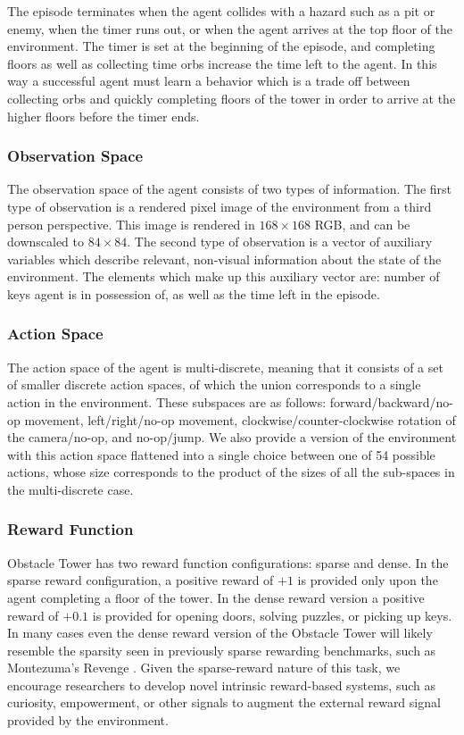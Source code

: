 \documentclass{article}
\begin{document}
The episode terminates when the agent collides with a hazard such as a pit or enemy, when the timer runs out, or when the agent arrives at the top floor of the environment. The timer is set at the beginning of the episode, and completing floors as well as collecting time orbs increase the time left to the agent. In this way a successful agent must learn a behavior which is a trade off between collecting orbs and quickly completing floors of the tower in order to arrive at the higher floors before the timer ends.

\subsubsection{Observation Space} The observation space of the agent consists of two types of information. The first type of observation is a rendered pixel image of the environment from a third person perspective. This image is rendered in $168\times168$ RGB, and can be downscaled to $84\times84$. The second type of observation is a vector of auxiliary variables which describe relevant, non-visual information about the state of the environment. The elements which make up this auxiliary vector are: number of keys agent is in possession of, as well as the time left in the episode.

\subsubsection{Action Space} The action space of the agent is multi-discrete, meaning that it consists of a set of smaller discrete action spaces, of which the union corresponds to a single action in the environment. These subspaces are as follows: forward/backward/no-op movement, left/right/no-op movement, clockwise/counter-clockwise rotation of the camera/no-op, and no-op/jump. We also provide a version of the environment with this action space flattened into a single choice between one of 54 possible actions, whose size corresponds to the product of the sizes of all the sub-spaces in the multi-discrete case.

\subsubsection{Reward Function} Obstacle Tower has two reward function configurations: sparse and dense. In the sparse reward configuration, a positive reward of $+1$ is provided only upon the agent completing a floor of the tower. In the dense reward version a positive reward of $+0.1$ is provided for opening doors, solving puzzles, or picking up keys. In many cases even the dense reward version of the Obstacle Tower will likely resemble the sparsity seen in previously sparse rewarding benchmarks, such as Montezuma's Revenge \cite{bellemare2013arcade}. Given the sparse-reward nature of this task, we encourage researchers to develop novel intrinsic reward-based systems, such as curiosity, empowerment, or other signals to augment the external reward signal provided by the environment. 
\end{document}
